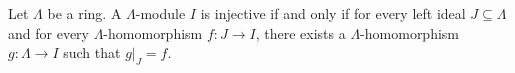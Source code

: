 Let $\Lambda$ be a ring. A $\Lambda$-module $I$ is injective if and only if for every left ideal $J \subseteq \Lambda$ and for every $\Lambda$-homomorphism $f : J \rightarrow I$, there exists a $\Lambda$-homomorphism $g : \Lambda \rightarrow I$ such that $g|_J = f$.
